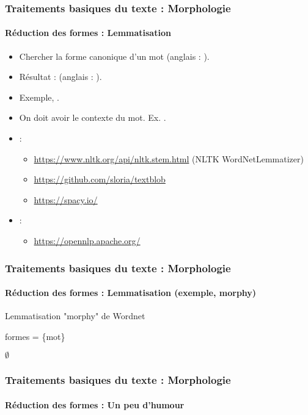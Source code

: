 \documentclass[xcolor=table]{beamer}
\begin{document}
\begin{frame}
\frametitle{Traitements basiques du texte : Morphologie}
\framesubtitle{Réduction des formes : Lemmatisation}

\begin{itemize}
	\item Chercher la forme canonique d'un mot (anglais : ).
	\item Résultat :  (anglais : ).
	\item Exemple, .
	\item On doit avoir le contexte du mot. Ex. .
	\item {} :
	\begin{itemize}
		\item \url{https://www.nltk.org/api/nltk.stem.html} (NLTK WordNetLemmatizer)
		\item \url{https://github.com/sloria/textblob}
		\item \url{https://spacy.io/}
	\end{itemize}
	\item {} :
	\begin{itemize}
		\item \url{https://opennlp.apache.org/}
	\end{itemize}
\end{itemize}

\end{frame}

\begin{frame}[fragile]
\frametitle{Traitements basiques du texte : Morphologie}
\framesubtitle{Réduction des formes : Lemmatisation (exemple, morphy)}

\begin{block}{Lemmatisation "morphy" de Wordnet}
	\footnotesize
	\begin{algorithm}[H]
		
		
		formes = \{mot\}
		
		
		\Return $ \emptyset $\;

	\end{algorithm}
\end{block}

\end{frame}

\begin{frame}
\frametitle{Traitements basiques du texte : Morphologie}
\framesubtitle{Réduction des formes : Un peu d'humour}


\end{frame}

\end{document}
